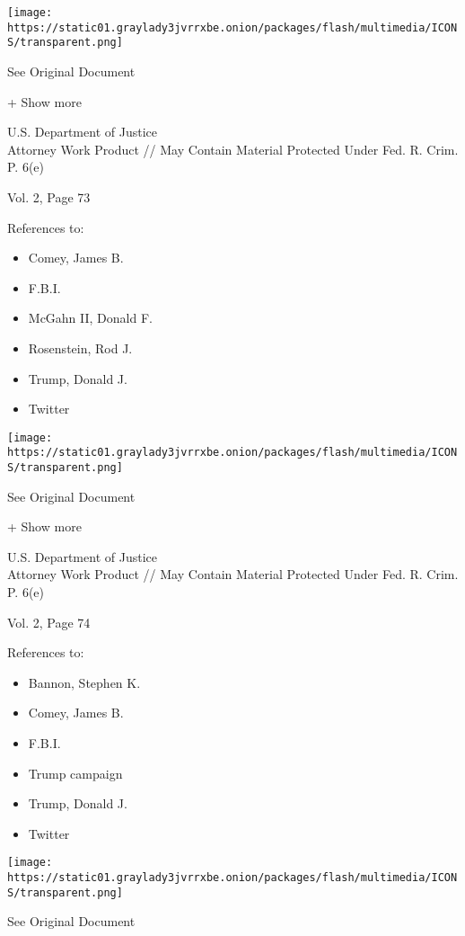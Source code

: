 \protect\hyperlink{}{}

\texttt{[image: https://static01.graylady3jvrrxbe.onion/packages/flash/multimedia/ICONS/transparent.png]}

See Original Document

+ Show more

U.S. Department of Justice\\
Attorney Work Product // May Contain Material Protected Under Fed. R.
Crim. P. 6(e)

Vol. 2, Page 73

References to:

\begin{itemize}
\tightlist
\item
  Comey, James B.
\item
  F.B.I.
\item
  McGahn II, Donald F.
\item
  Rosenstein, Rod J.
\item
  Trump, Donald J.
\item
  Twitter
\end{itemize}

\protect\hyperlink{}{}

\texttt{[image: https://static01.graylady3jvrrxbe.onion/packages/flash/multimedia/ICONS/transparent.png]}

See Original Document

+ Show more

U.S. Department of Justice\\
Attorney Work Product // May Contain Material Protected Under Fed. R.
Crim. P. 6(e)

Vol. 2, Page 74

References to:

\begin{itemize}
\tightlist
\item
  Bannon, Stephen K.
\item
  Comey, James B.
\item
  F.B.I.
\item
  Trump campaign
\item
  Trump, Donald J.
\item
  Twitter
\end{itemize}

\protect\hyperlink{}{}

\texttt{[image: https://static01.graylady3jvrrxbe.onion/packages/flash/multimedia/ICONS/transparent.png]}

See Original Document

